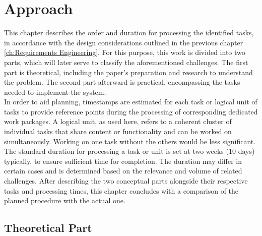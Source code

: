 

\chapter{Approach}
\label{ch:Approach}

This chapter describes the order and duration for processing the identified tasks, in accordance with the design considerations outlined in the previous chapter \ref{ch:Requirements Engineering}. 
For this purpose, this work is divided into two parts, which will later serve to classify the aforementioned challenges.
The first part is theoretical, including the paper's preparation and research to understand the problem. 
The second part afterward is practical, encompassing the tasks needed to implement the system. \\
\noindent In order to aid planning, timestamps are estimated for each task or logical unit of tasks to provide reference points during the processing of corresponding dedicated work packages. 
A logical unit, as used here, refers to a coherent cluster of individual tasks that share content or functionality and can be worked on simultaneously. Working on one task without the others would be less significant.
The standard duration for processing a task or unit is set at two weeks (10 days) typically, to ensure sufficient time for completion. The duration may differ in certain cases and is determined based on the relevance and volume of related challenges. 
After describing the two conceptual parts alongside their respective tasks and processing times, this chapter concludes with a comparison of the planned procedure with the actual one.

\section{Theoretical Part}
\label{ch:Approach:sec:Theoretical Part}

